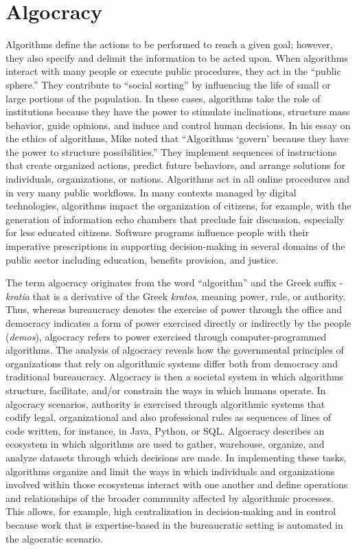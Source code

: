 \section{\label{sec:9.3}Algocracy}

Algorithms define the actions to be performed to reach a given goal; however, they also specify and delimit the information to be acted upon. When algorithms interact with many people or execute public procedures, they act in the ``public sphere.'' They contribute to ``social sorting'' by influencing the life of small or large portions of the population. In these cases, algorithms take the role of institutions because they have the power to stimulate inclinations, structure mass behavior, guide opinions, and induce and control human decisions. In his essay on the ethics of algorithms, Mike \citet{chap:9:Ananny:2016} noted that ``Algorithms `govern' because they have the power to structure possibilities.'' They implement sequences of instructions that create organized actions, predict future behaviors, and arrange solutions for individuals, organizations, or nations. Algorithms act in all online procedures and in very many public workflows. In many contexts managed by digital technologies, algorithms impact the organization of citizens, for example, with the generation of information echo chambers that preclude fair discussion, especially for less educated citizens. Software programs influence people with their imperative prescriptions in supporting decision-making in several domains of the public sector including education, benefits provision, and justice.

The term algocracy originates from the word ``algorithm'' and the Greek suffix -\textit{kratia} that is a derivative of the Greek \textit{kratos}, meaning power, rule, or authority. Thus, whereas bureaucracy denotes the exercise of power through the office and democracy indicates a form of power exercised directly or indirectly by the people (\textit{demos}), algocracy refers to power exercised through computer-programmed algorithms. The analysis of algocracy reveals how the governmental principles of organizations that rely on algorithmic systems differ both from democracy and traditional bureaucracy. Algocracy is then a societal system in which algorithms structure, facilitate, and/or constrain the ways in which humans operate. In algocracy scenarios, authority is exercised through algorithmic systems that codify legal, organizational and also professional rules as sequences of lines of code written, for instance, in Java, Python, or SQL. Algocracy describes an ecosystem in which algorithms are used to gather, warehouse, organize, and analyze datasets through which decisions are made. In implementing these tasks, algorithms organize and limit the ways in which individuals and organizations involved within those ecosystems interact with one another and define operations and relationships of the broader community affected by algorithmic processes. This allows, for example, high centralization in decision-making and in control because work that is expertise-based in the bureaucratic setting is automated in the algocratic scenario.

